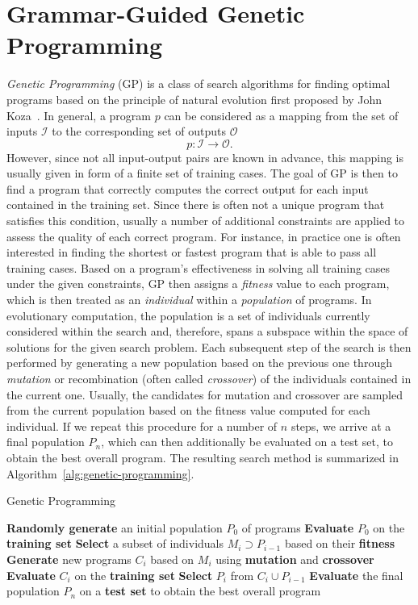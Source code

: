 \section{Grammar-Guided Genetic Programming}
\emph{Genetic Programming} (GP) is a class of search algorithms for finding optimal programs based on the principle of natural evolution first proposed by John Koza~\cite{koza1994genetic}.
In general, a program $p$ can be considered as a mapping from the set of inputs $\mathcal{I}$ to the corresponding set of outputs $\mathcal{O}$
\begin{equation}
	p : \mathcal{I} \to \mathcal{O}.
	\label{eq:gp-program}
\end{equation}
However, since not all input-output pairs are known in advance, this mapping is usually given in form of a finite set of training cases.
The goal of GP is then to find a program that correctly computes the correct output for each input contained in the training set.
Since there is often not a unique program that satisfies this condition, usually a number of additional constraints are applied to assess the quality of each correct program.
For instance, in practice one is often interested in finding the shortest or fastest program that is able to pass all training cases.
Based on a program's effectiveness in solving all training cases under the given constraints, GP then assigns a \emph{fitness} value to each program, which is then treated as an \emph{individual} within a \emph{population} of programs.
In evolutionary computation, the population is a set of individuals currently considered within the search and, therefore, spans a subspace within the space of solutions for the given search problem.
Each subsequent step of the search is then performed by generating a new population based on the previous one through \emph{mutation} or recombination (often called \emph{crossover}) of the individuals contained in the current one.
Usually, the candidates for mutation and crossover are sampled from the current population based on the fitness value computed for each individual.
If we repeat this procedure for a number of $n$ steps, we arrive at a final population $P_n$, which can then additionally be evaluated on a test set, to obtain the best overall program.
The resulting search method is summarized in Algorithm~\ref{alg:genetic-programming}. 
\begin{algorithm}[t]
	\caption{Genetic Programming}
	\label{alg:genetic-programming}
	\begin{algorithmic}[1] %
		\State \textbf{Randomly generate} an initial population $P_0$ of programs
		\State \textbf{Evaluate} $P_0$ on the \textbf{training set} 
		\State \textbf{Select} a subset of individuals $M_i \supset P_{i-1}$ based on their \textbf{fitness}
		\State \textbf{Generate} new programs $C_i$ based on $M_i$ using \textbf{mutation} and \textbf{crossover}
		\State \textbf{Evaluate} $C_i$ on the \textbf{training set} 
		\State \textbf{Select} $P_{i}$ from $C_i \cup P_{i-1}$
		\EndFor
		\State \textbf{Evaluate} the final population $P_{n}$ on a \textbf{test set}  to obtain the best overall program
	\end{algorithmic}
\end{algorithm}
